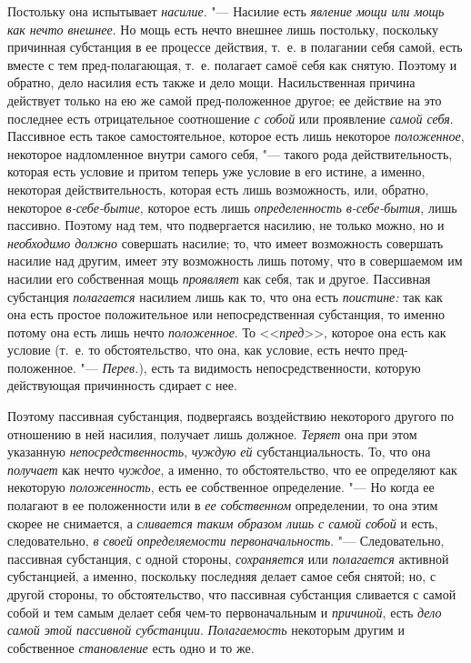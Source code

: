 Постольку она испытывает {\em насилие}. "--- Насилие есть
{\em явление мощи или мощь как нечто внешнее}. Но мощь
есть нечто внешнее лишь постольку, поскольку причинная субстанция в ее
процессе действия, т.~е. в полагании себя самой, есть вместе с тем
пред-полагающая, т.~е. полагает самоё себя как снятую. Поэтому и обратно,
дело насилия есть также и дело мощи. Насильственная причина действует
только на ею же самой пред-положенное другое; ее действие на это последнее
есть отрицательное соотношение {\em с собой} или
проявление {\em самой себя}. Пассивное есть такое
самостоятельное, которое есть лишь некоторое
{\em положенное}, некоторое надломленное внутри самого
себя, "--- такого рода действительность, которая есть условие и притом теперь
уже условие в его истине, а именно, некоторая действительность, которая
есть лишь возможность, или, обратно, некоторое
{\em в-себе-бытие}, которое есть лишь
{\em определенность в-себе-бытия}, лишь пассивно.
Поэтому над тем, что подвергается насилию, не только можно, но и
{\em необходимо должно} совершать насилие; то, что
имеет возможность совершать насилие над другим, имеет эту возможность лишь
потому, что в совершаемом им насилии его собственная мощь
{\em проявляет} как себя, так и другое. Пассивная
субстанция {\em полагается} насилием лишь как то, что
она есть {\em поистине:} так как она есть простое
положительное или непосредственная субстанция, то именно потому она есть
лишь нечто {\em положенное}. То <<{\em пред}>>, которое она есть как условие
(т.~е. то обстоятельство, что она, как условие, есть нечто
пред-положенное. "--- {\em Перев.}), есть та видимость непосредственности,
которую действующая причинность сдирает с нее.

Поэтому пассивная субстанция, подвергаясь воздействию некоторого другого по
отношению в ней насилия, получает лишь должное.
{\em Теряет} она при этом указанную {\em непосредственность},
{\em чуждую ей} субстанциальность. То, что она {\em получает} как нечто
{\em чуждое}, а именно, то обстоятельство, что ее
определяют как некоторую {\em положенность}, есть ее
собственное определение. "--- Но когда ее полагают в ее положенности или в
{\em ее собственном} определении, то она этим скорее не
снимается, а {\em сливается таким образом лишь с самой
собой} и есть, следовательно, {\em в своей
определяемости первоначальность}. "--- Следовательно, пассивная субстанция, с
одной стороны, {\em сохраняется} или
{\em полагается} активной субстанцией, а именно,
поскольку последняя делает самое себя снятой; но, с другой стороны, то
обстоятельство, что пассивная субстанция сливается с самой собой и тем
самым делает себя чем-то первоначальным и {\em причиной}, есть {\em дело
самой этой пассивной субстанции}. {\em Полагаемость} некоторым другим и
собственное {\em становление} есть одно и то же.

